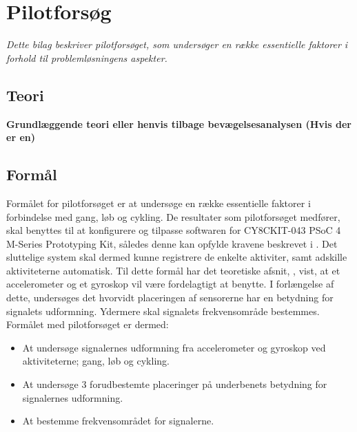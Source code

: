\chapter{Pilotforsøg}\vspace{-.75cm}
\textit{Dette bilag beskriver pilotforsøget, som undersøger en række essentielle faktorer i forhold til problemløsningens aspekter.}

\section{Teori}
\textbf{Grundlæggende teori eller henvis tilbage bevægelsesanalysen (Hvis der er en)}

\section{Formål}
Formålet for pilotforsøget er at undersøge en række essentielle faktorer i forbindelse med gang, løb og cykling. De resultater som pilotforsøget medfører, skal benyttes til at konfigurere og tilpasse softwaren for CY8CKIT-043 PSoC 4 M-Series Prototyping Kit, således denne kan opfylde kravene beskrevet i . \newline
Det sluttelige system skal dermed kunne registrere de enkelte aktiviter, samt adskille aktiviteterne automatisk. Til dette formål har det teoretiske afsnit, , vist, at et accelerometer og et gyroskop vil være fordelagtigt at benytte. I forlængelse af dette, undersøges det hvorvidt placeringen af sensorerne har en betydning for signalets udformning. Ydermere skal signalets frekvensområde bestemmes. \newline
Formålet med pilotforsøget er dermed:
\begin{itemize}
\item At undersøge signalernes udformning fra accelerometer og gyroskop ved aktiviteterne; gang, løb og cykling. 
\item At undersøge 3 forudbestemte placeringer på underbenets betydning for signalernes udformning.
\item At bestemme frekvensområdet for signalerne.
\end{itemize}

